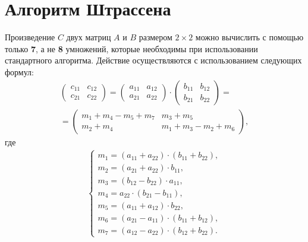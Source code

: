 \section{Алгоритм Штрассена}
Произведение $C$ двух матриц $A$ и $B$ размером $2 \times 2$ можно вычислить с помощью только \textbf{7}, а не \textbf{8} умножений, которые необходимы при использовании стандартного алгоритма.
Действие осуществляются с использованием следующих формул:
\begin{equation}
    \label{eq:strassen_1}
    \begin{gathered}
        \begin{pmatrix}
            c_{11} & c_{12} \\
            c_{21} & c_{22} 
        \end{pmatrix}
        = 
        \begin{pmatrix}
            a_{11} & a_{12} \\
            a_{21} & a_{22} 
        \end{pmatrix}
        \cdot
        \begin{pmatrix}
            b_{11} & b_{12} \\
            b_{21} & b_{22} 
        \end{pmatrix}
        = \\ =
        \begin{pmatrix}
            m_{1} + m_{4} - m_{5} + m_{7} & m_{3} + m_{5} \\
            m_{2} + m_{4} &m_{1} + m_{3} - m_{2} + m_{6}
        \end{pmatrix},
    \end{gathered}
\end{equation}
где
\begin{equation}
    \begin{gathered}
        \begin{cases}
            m_{1} = (a_{11} + a_{22}) \cdot (b_{11} + b_{22}), \\
            m_{2} = (a_{21} + a_{22}) \cdot b_{11}, \\
            m_{3} = (b_{12} - b_{22}) \cdot a_{11}, \\
            m_{4} = a_{22} \cdot (b_{21} - b_{11}), \\
            m_{5} = (a_{11} + a_{12}) \cdot b_{22}, \\
            m_{6} = (a_{21} - a_{11}) \cdot (b_{11} + b_{12}), \\
            m_{7} = (a_{12} - a_{22}) \cdot (b_{12} + b_{22}).
        \end{cases}
    \end{gathered}
\end{equation}

